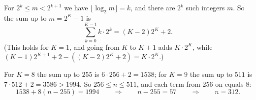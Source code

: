 For $2^k\le m<2^{k+1}$ we have $\lfloor\log_2 m\rfloor=k$, and there are $2^k$ such integers $m$. So the sum up to $m=2^K-1$ is
\[
\sum_{k=0}^{K-1}k\cdot2^k=(K-2)2^K+2 .
\]
(This holds for $K=1$, and going from $K$ to $K+1$ adds $K\cdot2^K$, while $(K-1)2^{K+1}+2-\left((K-2)2^K+2\right)=K\cdot2^K$.)

For $K=8$ the sum up to $255$ is $6\cdot256+2=1538$; for $K=9$ the sum up to $511$ is $7\cdot512+2=3586>1994$. So $256\le n\le511$, and each term from $256$ on equals $8$:
\[
1538+8(n-255)=1994\qquad\Longrightarrow\qquad n-255=57\qquad\Longrightarrow\qquad n=\boxed{312}.
\]
